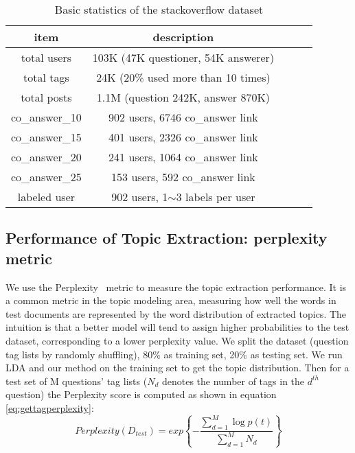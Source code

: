 \begin{table}[htp]
\caption{Basic statistics of the stackoverflow dataset}
\label{tab:stackoverflowdataset}
\centering
\begin{tabular}{|c|c|c|c|c|}
\hline
\textbf{item} & \textbf{description} \\
\hline
total users & 103K (47K questioner, 54K answerer)\\
\hline
total tags & 24K (20\% used more than 10 times)\\
\hline
total posts & 1.1M (question 242K, answer 870K) \\
\hline
co\_answer\_10 & 902 users, 6746 co\_answer link\\
\hline
co\_answer\_15 & 401 users, 2326 co\_answer link\\
\hline
co\_answer\_20 & 241 users, 1064 co\_answer link\\
\hline
co\_answer\_25 & 153 users, 592 co\_answer link\\
\hline
labeled user & 902 users, 1$\sim$3 labels per user\\
\hline
\end{tabular}
\end{table}


\subsection{Performance of Topic Extraction: perplexity metric}
We use the Perplexity~\cite{blei2003latent} metric to measure the topic extraction performance. It is a common metric in the topic modeling area, measuring how well the words in test documents are represented by the word distribution of extracted topics. The intuition is that a better model will tend to assign higher probabilities to the test dataset, corresponding to a lower perplexity value. We split the dataset (question tag lists by randomly shuffling), 80\% as training set, 20\% as testing set.
We run LDA and our method on the training set to get the topic distribution. Then for a test set of M questions' tag lists ($N_d$ denotes the number of tags in the $d^{th}$ question) the Perplexity score is computed as shown in equation \ref{eq:gettagperplexity}:
\begin{equation}
  Perplexity(D_{test})=exp\left\{-\frac{\sum_{d=1}^{M}\log p(t)}{\sum_{d=1}^{M}N_d}\right\}
\label{eq:gettagperplexity}
\end{equation}

